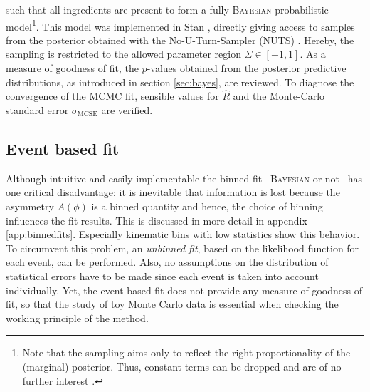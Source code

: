 such that all ingredients are present to form a fully \textsc{Bayesian} probabilistic model\footnote{Note that the sampling aims only to reflect the right proportionality of the (marginal) posterior. Thus, constant terms can be dropped and are of no further interest \cite{stan}.}. This model was implemented in Stan \cite{stan}, directly giving access to samples from the posterior obtained with the No-U-Turn-Sampler (NUTS) \cite{stan,nuts}. Hereby, the sampling is restricted to the allowed parameter region $\Sigma\in[-1,1]$. As a measure of goodness of fit, the $p$-values obtained from the posterior predictive distributions, as introduced in section \ref{sec:bayes}, are reviewed. To diagnose the convergence of the MCMC fit, sensible values for $\hat{R}$ and the Monte-Carlo standard error $\sigma_\text{MCSE}$ are verified.
\subsection{Event based fit}
\label{subsec:evfit}
Although intuitive and easily implementable the binned fit --\textsc{Bayesian} or not-- has one critical disadvantage: it is inevitable that information is lost because the asymmetry $A(\phi)$ is a binned quantity and hence, the choice of binning influences the fit results. This is discussed in more detail in appendix \ref{app:binnedfits}. Especially kinematic bins with low statistics show this behavior. To circumvent this problem, an \emph{unbinned fit}, based on the likelihood function for each event, can be performed. Also, no assumptions on the distribution of statistical errors have to be made since each event is taken into account individually. Yet, the event based fit does not provide any measure of goodness of fit, so that the study of toy Monte Carlo data is essential when checking the working principle of the method.

